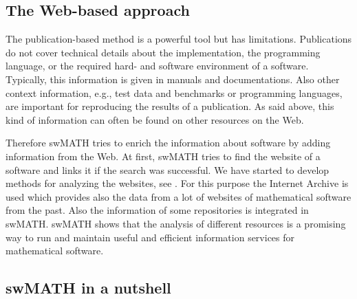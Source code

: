 \documentclass[12pt]{article}
\begin{document}
\subsection{The Web-based approach}
The publication-based method is a powerful tool but has
limitations. Publications do not cover technical details about the
implementation, the programming language, or the required hard- and software
environment of a software. Typically, this information is given in manuals and
documentations. Also other context information, e.g., test data and benchmarks
or programming languages, are important for reproducing the results of a
publication. As said above, this kind of information can often be found on
other resources on the Web.

Therefore swMATH tries to enrich the information about software by adding
information from the Web. At first, swMATH tries to find the website of a
software and links it if the search was successful.  We have started to develop
methods for analyzing the websites, see \cite{TPDL}. For this purpose the
Internet Archive \cite{IA} is used which provides also the data from a lot of
websites of mathematical software from the past.  Also the information of some
repositories is integrated in swMATH.  swMATH shows that the analysis of
different resources is a promising way to run and maintain useful and efficient
information services for mathematical software.\par


\subsection{swMATH in a nutshell}
\end{document}
